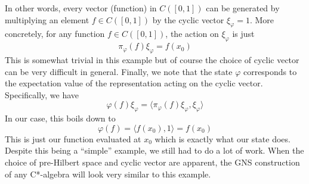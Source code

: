 \begin{example}
In other words, every vector (function) in $C([0,1])$ can be generated by multiplying
an element $f \in C([0,1])$ by the cyclic vector $\xi_\varphi = 1$. More concretely, for
any function $f \in C([0,1])$, the action on $\xi_\varphi$ is just
\begin{equation*}
    \pi_\varphi(f)\xi_\varphi = f(x_0)
\end{equation*}
This is somewhat trivial in this example but of course the choice of cyclic vector
can be very difficult in general. Finally, we note that the state  $\varphi$ corresponds
 to the expectation value of the representation acting on the cyclic vector.
Specifically, we have
\begin{equation*}
    \varphi(f)\xi_\varphi = \langle \pi_\varphi (f) \xi_\varphi, \xi_\varphi \rangle
\end{equation*}
In our case, this boils down to
\begin{equation*}
    \varphi(f) = \langle f(x_0), 1 \rangle = f(x_0)
\end{equation*}
This is just our function evaluated at $x_0$ which is exactly what our state does.
Despite this being a ``simple'' example, we still had to do a lot of work. When
the choice of pre-Hilbert space and cyclic vector are apparent, the GNS construction
of any C*-algebra will look very similar to this example.
\end{example}


